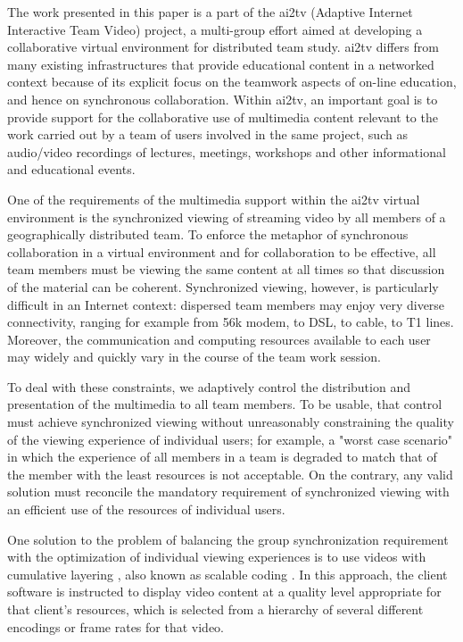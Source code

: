 \documentclass{sig-alternate}
\begin{document}
The work presented in this paper is a part of the ai2tv (Adaptive
Internet Interactive Team Video) project, a multi-group effort aimed
at developing a collaborative virtual environment for distributed team
study.  ai2tv differs from many existing infrastructures that provide
educational content in a networked context because of its explicit
focus on the teamwork aspects of on-line education, and hence on
synchronous collaboration.  Within ai2tv, an important goal is to
provide support for the collaborative use of multimedia content
relevant to the work carried out by a team of users involved in the
same project, such as audio/video recordings of lectures, meetings,
workshops and other informational and educational events.

One of the requirements of the multimedia support within the ai2tv
virtual environment is the synchronized viewing of streaming video by
all members of a geographically distributed team.  To enforce the
metaphor of synchronous collaboration in a virtual environment and for
collaboration to be effective, all team members must be viewing the
same content at all times so that discussion of the material can be
coherent.  Synchronized viewing, however, is particularly difficult in
an Internet context: dispersed team members may enjoy very diverse
connectivity, ranging for example from 56k modem, to DSL, to cable, to
T1 lines.  Moreover, the communication and computing resources
available to each user may widely and quickly vary in the course of
the team work session.

To deal with these constraints, we adaptively control the distribution
and presentation of the multimedia to all team members.  To be usable,
that control must achieve synchronized viewing without unreasonably
constraining the quality of the viewing experience of individual
users; for example, a "worst case scenario" in which the experience of
all members in a team is degraded to match that of the member with the
least resources is not acceptable. On the contrary, any valid solution
must reconcile the mandatory requirement of synchronized viewing with
an efficient use of the resources of individual users.

One solution to the problem of balancing the group synchronization
requirement with the optimization of individual viewing experiences is
to use videos with cumulative layering \cite{MCCANNE}, also known as
scalable coding \cite{LI}.  In this approach, the client software is
instructed to display video content at a quality level appropriate for
that client's resources, which is selected from a hierarchy of several
different encodings or frame rates for that video.
\end{document}
